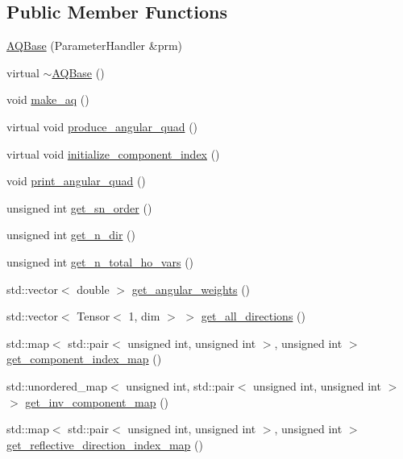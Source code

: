 \subsection*{Public Member Functions}
\begin{DoxyCompactItemize}
\item 
\hyperlink{class_a_q_base_a3a05ceb6b201b4e6e605b260d766842d}{A\+Q\+Base} (Parameter\+Handler \&prm)
\item 
virtual \hyperlink{class_a_q_base_ab394068aae3c9b3f3932c3bfa3edceab}{$\sim$\+A\+Q\+Base} ()
\item 
void \hyperlink{class_a_q_base_ad8bf7c63bde67a2f514aea2c589983dd}{make\+\_\+aq} ()
\item 
virtual void \hyperlink{class_a_q_base_a16c7871be0da6c112f547f39d50258fd}{produce\+\_\+angular\+\_\+quad} ()
\item 
virtual void \hyperlink{class_a_q_base_ab1cbcd2132328df15fb9651597e8ab48}{initialize\+\_\+component\+\_\+index} ()
\item 
void \hyperlink{class_a_q_base_adbe2961a0c0db888ca6a22ead08732eb}{print\+\_\+angular\+\_\+quad} ()
\item 
unsigned int \hyperlink{class_a_q_base_a9ce78884d13c584a8f415c16976ea6f0}{get\+\_\+sn\+\_\+order} ()
\item 
unsigned int \hyperlink{class_a_q_base_a803528777761efa898b046e374008744}{get\+\_\+n\+\_\+dir} ()
\item 
unsigned int \hyperlink{class_a_q_base_af367f668495d928c27a985b081868c6c}{get\+\_\+n\+\_\+total\+\_\+ho\+\_\+vars} ()
\item 
std\+::vector$<$ double $>$ \hyperlink{class_a_q_base_ac3db7e901486ff088e4eac2f1401f3b6}{get\+\_\+angular\+\_\+weights} ()
\item 
std\+::vector$<$ Tensor$<$ 1, dim $>$ $>$ \hyperlink{class_a_q_base_ac2e0120510426f0b1dded2d5b546038b}{get\+\_\+all\+\_\+directions} ()
\item 
std\+::map$<$ std\+::pair$<$ unsigned int, unsigned int $>$, unsigned int $>$ \hyperlink{class_a_q_base_a016f7ac88052a26c82c8aa3bfba80f73}{get\+\_\+component\+\_\+index\+\_\+map} ()
\item 
std\+::unordered\+\_\+map$<$ unsigned int, std\+::pair$<$ unsigned int, unsigned int $>$ $>$ \hyperlink{class_a_q_base_a6c6f10b941afa4019a5d919eee33ebee}{get\+\_\+inv\+\_\+component\+\_\+map} ()
\item 
std\+::map$<$ std\+::pair$<$ unsigned int, unsigned int $>$, unsigned int $>$ \hyperlink{class_a_q_base_a1cb901657861f7fc580fc29e10c0b691}{get\+\_\+reflective\+\_\+direction\+\_\+index\+\_\+map} ()
\end{DoxyCompactItemize}
